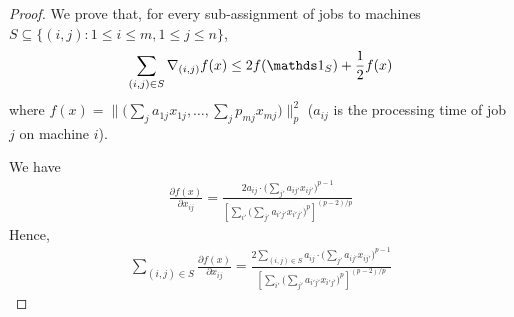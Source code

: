 \begin{proof}
We prove that, for every sub-assignment of jobs to machines $S \subseteq \{(i,j): 1 \leq i \leq m, 1 \leq j \leq n\}$,
%
\begin{align}	\label{ineq:lp-smooth}
\sum_{(i,j) \in S} \nabla_{(i,j)} f(x) \leq 2 f(\one_{S}) + \frac{1}{2} f(x)
\end{align}
where $f(x) = \| \bigl( \sum_{j} a_{1j} x_{1j}, \ldots, \sum_{j} p_{mj} x_{mj} \bigr)\|_{p}^{2}$
($a_{ij}$ is the processing time of job $j$ on machine $i$).


We have
%
\begin{align*}
\frac{\partial f(x)}{\partial x_{ij}}
= \frac{2a_{ij} \cdot \bigl( \sum_{j'} a_{ij'} x_{ij'} \bigr)^{p-1} }{ \left[ \sum_{i'} \bigl( \sum_{j'} a_{i'j'} x_{i'j'} \bigr)^{p} \right]^{(p-2)/p}}
\end{align*}
Hence,
\begin{align*}
\sum_{(i,j) \in S} \frac{\partial f(x)}{\partial x_{ij}}
= \frac{ 2 \sum_{(i,j) \in S} a_{ij} \cdot \bigl( \sum_{j'} a_{ij'} x_{ij'} \bigr)^{p-1} }{ \left[ \sum_{i'} \bigl( \sum_{j'} a_{i'j'} x_{i'j'} \bigr)^{p} \right]^{(p-2)/p}}
\end{align*}


\end{proof}

